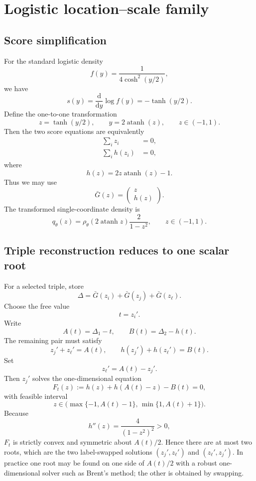 \documentclass[11pt]{article}
\newcommand{\1}{\mathbf{1}}
\newcommand{\dd}{\mathrm{d}}
\newcommand{\atanh}{\operatorname{atanh}}
\begin{document}
\section{Logistic location--scale family}

\subsection{Score simplification}

For the standard logistic density
\[
    f(y)=\frac{1}{4\cosh^2(y/2)},
\]
we have
\[
    s(y)=\frac{\dd}{\dd y}\log f(y)
    =-\tanh(y/2).
\]
Define the one-to-one transformation
\begin{equation}
\boxed{
    z=\tanh(y/2),
    \qquad
    y=2\atanh(z),
    \qquad z\in(-1,1).
}
\end{equation}
Then the two score equations are equivalently
\begin{align}
    \sum_i z_i &=0,\\
    \sum_i h(z_i)&=0,
\end{align}
where
\begin{equation}
\boxed{
    h(z)=2z\atanh(z)-1.
}
\end{equation}
Thus we may use
\[
    \bar G(z)
    =
    \begin{pmatrix}
        z\\h(z)
    \end{pmatrix}.
\]
The transformed single-coordinate density is
\begin{equation}
\boxed{
    q_\theta(z)
    =\rho_\theta(2\atanh z)\frac{2}{1-z^2},
    \qquad z\in(-1,1).
}
\end{equation}

\subsection{Triple reconstruction reduces to one scalar root}

For a selected triple, store
\[
    \Delta
    =\bar G(z_i)+\bar G(z_j)+\bar G(z_\ell).
\]
Choose the free value
\[
    t=z_i'.
\]
Write
\[
    A(t)=\Delta_1-t,
    \qquad
    B(t)=\Delta_2-h(t).
\]
The remaining pair must satisfy
\[
    z_j'+z_\ell'=A(t),
    \qquad
    h(z_j')+h(z_\ell')=B(t).
\]
Set
\[
    z_\ell'=A(t)-z_j'.
\]
Then $z_j'$ solves the one-dimensional equation
\begin{equation}
\boxed{
    F_t(z)
    :=h(z)+h(A(t)-z)-B(t)=0,
}
\label{eq:logistic-root}
\end{equation}
with feasible interval
\[
    z\in
    \bigl(\max\{-1,A(t)-1\},\,\min\{1,A(t)+1\}\bigr).
\]
Because
\[
    h''(z)=\frac{4}{(1-z^2)^2}>0,
\]
$F_t$ is strictly convex and symmetric about $A(t)/2$.  Hence there are at most two roots, which are the two label-swapped solutions $(z_j',z_\ell')$ and $(z_\ell',z_j')$.  In practice one root may be found on one side of $A(t)/2$ with a robust one-dimensional solver such as Brent's method; the other is obtained by swapping.
\end{document}
